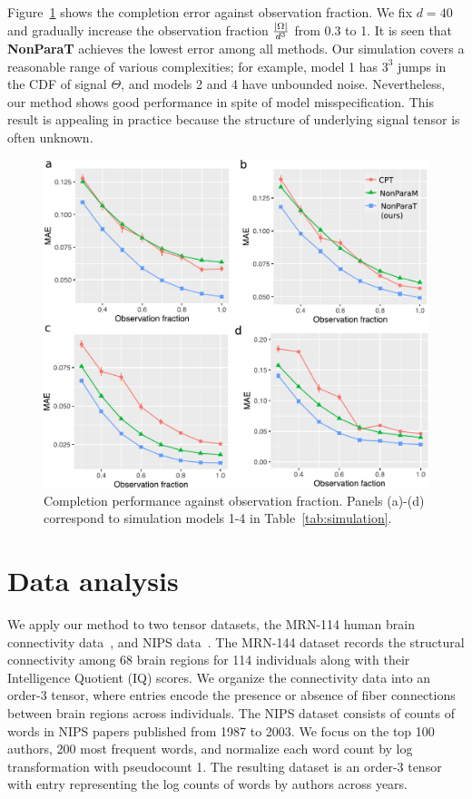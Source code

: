 \documentclass{article}
\theoremstyle{plain}
\theoremstyle{definition}
\begin{document}
Figure~\ref{fig:compare2} shows the completion error against observation fraction. We fix $d=40$ and gradually increase the observation fraction ${|\Omega|\over d^3}$ from 0.3 to 1. It is seen that {\bf NonParaT} achieves the lowest error among all methods. Our simulation covers a reasonable range of various complexities; %
for example, model 1 has $3^3$ jumps in the CDF of signal $\Theta$, and models 2 and 4 have unbounded noise. Nevertheless, our method shows good performance in spite of model misspecification. This result is appealing in practice because the structure of underlying signal tensor is often unknown. 

\begin{figure}[h!]
\vspace{-.2cm}
\includegraphics[width=.45\textwidth]{figure/fig5-8.pdf}
\vspace{-.2cm}
\caption{Completion performance against observation fraction. Panels (a)-(d) correspond to simulation models 1-4 in Table~\ref{tab:simulation}. }\label{fig:compare2}
\vspace{-.4cm}
\end{figure}

\section{Data analysis}
We apply our method to two tensor datasets, the MRN-114 human brain connectivity data~\citep{wang2017bayesian}, and NIPS data~\cite{globerson2007euclidean}. The MRN-144 dataset records the structural connectivity among 68 brain regions for 114 individuals along with their Intelligence Quotient (IQ) scores. We organize the connectivity data into an order-3 tensor, where entries encode the presence or absence of fiber connections between brain regions across individuals. The NIPS dataset consists of counts of words in NIPS papers published from 1987 to 2003. We focus on the top 100 authors, 200 most frequent words, and normalize each word count by log transformation with pseudocount 1. The resulting dataset is an order-3 tensor with entry representing the log counts of words by authors across years. 
\end{document}
